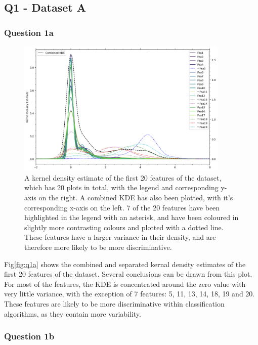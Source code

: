 
\subsection{Q1 - Dataset A}\label{subsec:dataset-a}
\subsubsection{Question 1a}\label{subsubsec:q1a}
    \begin{figure}[htb]
    \centering
    \includegraphics[width=0.9\textwidth]{./figures/q1a}
    \caption{A kernel density estimate of the first 20 features of the  dataset, which has 20
    plots in total, with the legend and corresponding y-axis on the right. A combined KDE has also been plotted, with
    it's corresponding x-axis on the left. 7 of the 20 features have been highlighted in the legend with an asterisk,
    and have been coloured in slightly more contrasting colours and plotted with a dotted line. These features have a
    larger variance in their density, and are therefore more likely to be more discriminative.}
    \label{fig:q1a}
    \end{figure}

    Fig\eqref{fig:q1a} shows the combined and separated kernal density estimates of the first 20 features of the dataset.
    Several conclusions can be drawn from this plot.
    For most of the features, the KDE is concentrated around the zero value with very little variance, with the exception
    of 7 features: 5, 11, 13, 14, 18, 19 and 20.
    These features are likely to be more discriminative within classification algorithms, as they contain more variability.

\subsubsection{Question 1b}\label{subsubsec:q1b}

